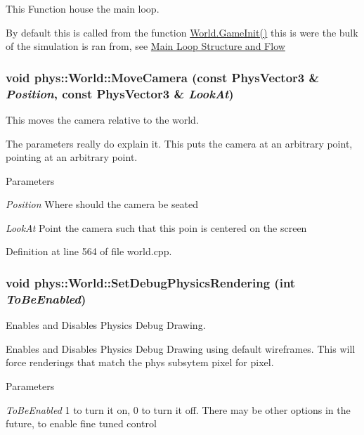 This Function house the main loop. 

By default this is called from the function \hyperlink{classphys_1_1World_a21cc36be08a61f40619584d4c438936b}{World.GameInit()} this is were the bulk of the simulation is ran from, see \hyperlink{mainloop1}{Main Loop Structure and Flow} \hypertarget{classphys_1_1World_ad461d55f869f8aef72d0f0e0eb1b04dd}{
\subsubsection[{MoveCamera}]{\setlength{\rightskip}{0pt plus 5cm}void phys::World::MoveCamera (const {\bf PhysVector3} \& {\em Position}, \/  const {\bf PhysVector3} \& {\em LookAt})}}
\label{da/ddf/classphys_1_1World_ad461d55f869f8aef72d0f0e0eb1b04dd}


This moves the camera relative to the world. 

The parameters really do explain it. This puts the camera at an arbitrary point, pointing at an arbitrary point. 
\begin{DoxyParams}{Parameters}
\item[{\em Position}]Where should the camera be seated \item[{\em LookAt}]Point the camera such that this poin is centered on the screen \end{DoxyParams}


Definition at line 564 of file world.cpp.

\hypertarget{classphys_1_1World_a9fbd112d2677aa948301287d541b64bb}{
\subsubsection[{SetDebugPhysicsRendering}]{\setlength{\rightskip}{0pt plus 5cm}void phys::World::SetDebugPhysicsRendering (int {\em ToBeEnabled})}}
\label{da/ddf/classphys_1_1World_a9fbd112d2677aa948301287d541b64bb}


Enables and Disables Physics Debug Drawing. 

Enables and Disables Physics Debug Drawing using default wireframes. This will force renderings that match the phys subsytem pixel for pixel. 
\begin{DoxyParams}{Parameters}
\item[{\em ToBeEnabled}]1 to turn it on, 0 to turn it off. There may be other options in the future, to enable fine tuned control \end{DoxyParams}


